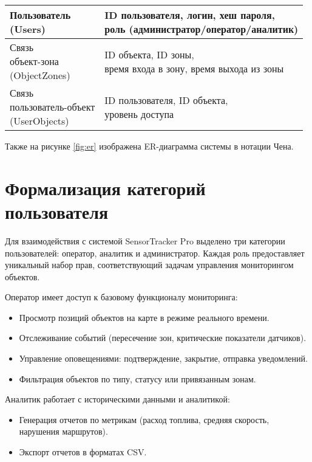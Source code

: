 \begin{table}[H]
\begin{tabular}{|l|l|}
		\makecell{Пользователь \\ (Users)}     & \makecell{ID пользователя, логин, хеш пароля, \\ роль (администратор/оператор/аналитик)} \\ \hline
		\makecell{Связь \\ объект-зона \\ (ObjectZones)} & \makecell{ID объекта, ID зоны, \\ время входа в зону, время выхода из зоны} \\ \hline
		\makecell{Связь \\ пользователь-объект \\ (UserObjects)} & \makecell{ID пользователя, ID объекта, \\ уровень доступа} \\ \hline
	\end{tabular}
\end{table}
\clearpage
Также на рисунке \ref{fig:er} изображена ER-диаграмма системы в нотации Чена.


\clearpage

\section{Формализация категорий пользователя}

Для взаимодействия с системой SensorTracker Pro выделено три категории пользователей: оператор, аналитик и администратор. Каждая роль предоставляет уникальный набор прав, соответствующий задачам управления мониторингом объектов.

Оператор имеет доступ к базовому функционалу мониторинга:
\begin{itemize}
	\item Просмотр позиций объектов на карте в режиме реального времени.
	\item Отслеживание событий (пересечение зон, критические показатели датчиков).
	\item Управление оповещениями: подтверждение, закрытие, отправка уведомлений.
	\item Фильтрация объектов по типу, статусу или привязанным зонам.
\end{itemize}

Аналитик работает с историческими данными и аналитикой:
\begin{itemize}
	\item Генерация отчетов по метрикам (расход топлива, средняя скорость, нарушения маршрутов).
	\item Экспорт отчетов в форматах CSV.
\end{itemize}

